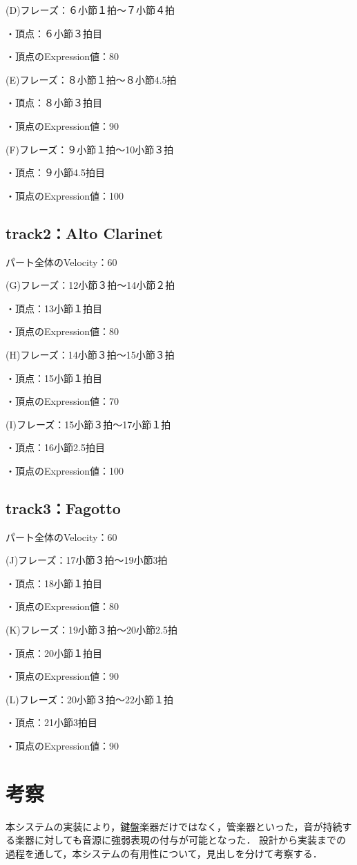 (D)フレーズ：６小節１拍～７小節４拍

・頂点：６小節３拍目

・頂点のExpression値：80

(E)フレーズ：８小節１拍～８小節4.5拍

・頂点：８小節３拍目

・頂点のExpression値：90


(F)フレーズ：９小節１拍～10小節３拍

・頂点：９小節4.5拍目

・頂点のExpression値：100

\subsection{track2：Alto Clarinet}
パート全体のVelocity：60

(G)フレーズ：12小節３拍～14小節２拍

・頂点：13小節１拍目

・頂点のExpression値：80


(H)フレーズ：14小節３拍～15小節３拍

・頂点：15小節１拍目

・頂点のExpression値：70


(I)フレーズ：15小節３拍～17小節１拍

・頂点：16小節2.5拍目

・頂点のExpression値：100

\subsection{track3：Fagotto}
パート全体のVelocity：60

(J)フレーズ：17小節３拍～19小節3拍

・頂点：18小節１拍目

・頂点のExpression値：80


(K)フレーズ：19小節３拍～20小節2.5拍

・頂点：20小節１拍目

・頂点のExpression値：90

(L)フレーズ：20小節３拍～22小節１拍

・頂点：21小節3拍目

・頂点のExpression値：90

\section{考察}
本システムの実装により，鍵盤楽器だけではなく，管楽器といった，音が持続する楽器に対しても音源に強弱表現の付与が可能となった．
設計から実装までの過程を通して，本システムの有用性について，見出しを分けて考察する．

